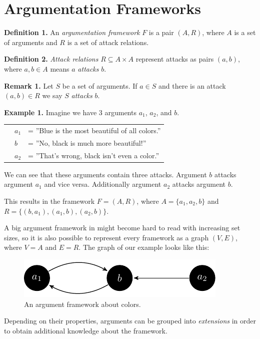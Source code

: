 \documentclass[draft,final]{vutinfth} %
\newcommand{\hl}{\par\vspace{6pt}} %
\newcommand{\cl}{\par\vspace{12pt}} %
\begin{document}
\section{Argumentation Frameworks}

\textbf{Definition 1.} An \emph{argumentation framework} $F$ is a pair $(A,R)$, where $A$ is a set of arguments and $R$ is a set of attack relations.\cl

\textbf{Definition 2.} \emph{Attack relations} $R\subseteq A\times A$ represent attacks as pairs $(a,b)$, where $a,b\in A$ means $a$ \emph{attacks} $b$.\cl

\textbf{Remark 1.} Let $S$ be a set of arguments. If $a\in S$ and there is an attack $(a,b)\in R$ we say $S$ \emph{attacks} $b$.\cl

\textbf{Example 1.} Imagine we have 3 arguments $a_1$, $a_2$, and $b$.\hl
			\begin{tabular}{p{0.5cm}p{0.5cm}l}
			& $a_1$ & = ''Blue is the most beautiful of all colors.''\\
			& $b$ & = ''No, black is much more beautiful!''\\
			& $a_2$ & = ''That's wrong, black isn't even a color.''
			\end{tabular}\hl
We can see that these arguments contain three attacks. Argument $b$ attacks argument $a_1$ and vice versa. Additionally argument $a_2$ attacks argument $b$.\hl
This results in the framework $F=(A,R)$, where $A=\{a_1,a_2,b\}$ and $R=\{(b,a_1),(a_1,b),(a_2,b)\}$.\cl

A big argument framework in might become hard to read with increasing set sizes, so it is also possible to represent every framework as a graph $(V,E)$, where $V=A$ and $E=R$. The graph of our example looks like this:

\FloatBarrier
	\begin{figure}[!h]
		\centering
		\includegraphics[width=\linewidth]{graphs/ex1_v2.pdf}
		\caption{An argument framework about colors.}
	\end{figure}
\FloatBarrier

Depending on their properties, arguments can be grouped into \emph{extensions} in order to obtain additional knowledge about the framework.\cl
\end{document}
